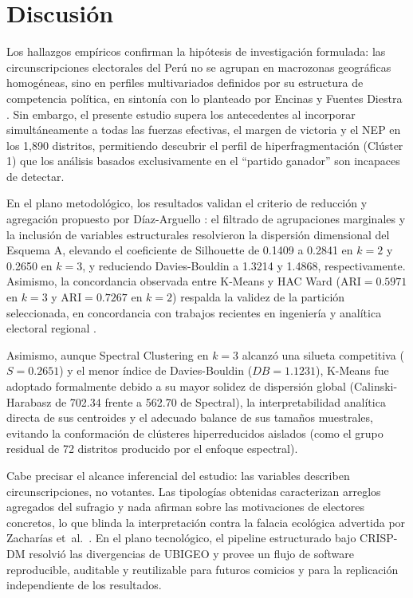 \documentclass[conference,10pt,letterpaper]{IEEEtran}
\begin{document}
\section{Discusión}

Los hallazgos empíricos confirman la hipótesis de investigación formulada: las circunscripciones electorales del Perú no se agrupan en macrozonas geográficas homogéneas, sino en perfiles multivariados definidos por su estructura de competencia política, en sintonía con lo planteado por Encinas y Fuentes Diestra \cite{encinas2021}. Sin embargo, el presente estudio supera los antecedentes al incorporar simultáneamente a todas las fuerzas efectivas, el margen de victoria y el NEP en los 1,890 distritos, permitiendo descubrir el perfil de hiperfragmentación (Clúster 1) que los análisis basados exclusivamente en el ``partido ganador'' son incapaces de detectar.

En el plano metodológico, los resultados validan el criterio de reducción y agregación propuesto por Díaz-Arguello \cite{diaz2025}: el filtrado de agrupaciones marginales y la inclusión de variables estructurales resolvieron la dispersión dimensional del Esquema A, elevando el coeficiente de Silhouette de 0.1409 a 0.2841 en $k = 2$ y 0.2650 en $k = 3$, y reduciendo Davies-Bouldin a 1.3214 y 1.4868, respectivamente. Asimismo, la concordancia observada entre K-Means y HAC Ward ($\mathrm{ARI} = 0.5971$ en $k = 3$ y $\mathrm{ARI} = 0.7267$ en $k = 2$) respalda la validez de la partición seleccionada, en concordancia con trabajos recientes en ingeniería y analítica electoral regional \cite{rebolledo2025, jacintho2021}.

Asimismo, aunque Spectral Clustering en $k = 3$ alcanzó una silueta competitiva ($S = 0.2651$) y el menor índice de Davies-Bouldin ($DB = 1.1231$), K-Means fue adoptado formalmente debido a su mayor solidez de dispersión global (Calinski-Harabasz de 702.34 frente a 562.70 de Spectral), la interpretabilidad analítica directa de sus centroides y el adecuado balance de sus tamaños muestrales, evitando la conformación de clústeres hiperreducidos aislados (como el grupo residual de 72 distritos producido por el enfoque espectral).

Cabe precisar el alcance inferencial del estudio: las variables describen circunscripciones, no votantes. Las tipologías obtenidas caracterizan arreglos agregados del sufragio y nada afirman sobre las motivaciones de electores concretos, lo que blinda la interpretación contra la falacia ecológica advertida por Zacharías et~al.~\cite{zacharias2015}. En el plano tecnológico, el pipeline estructurado bajo CRISP-DM resolvió las divergencias de UBIGEO y provee un flujo de software reproducible, auditable y reutilizable para futuros comicios y para la replicación independiente de los resultados.
\end{document}
